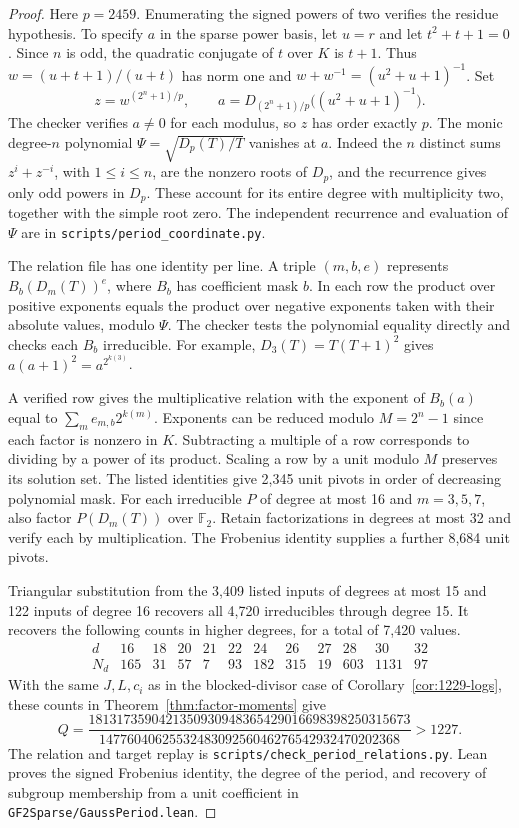 \documentclass[11pt]{article}
\newcommand{\F}{\mathbb F_2}
\begin{document}
\begin{proof}
Here \(p=2459\). Enumerating the signed powers of two verifies the
residue hypothesis. To specify \(a\) in the sparse power basis,
let \(u=r\) and let \(t^2+t+1=0\). Since \(n\) is odd, the quadratic
conjugate of \(t\) over \(K\) is \(t+1\). Thus
\(w=(u+t+1)/(u+t)\) has norm one and
\(w+w^{-1}=(u^2+u+1)^{-1}\). Set
\[
 z=w^{(2^n+1)/p},\qquad a=D_{(2^n+1)/p}\big((u^2+u+1)^{-1}\big).
\]
The checker verifies \(a\ne0\) for each modulus, so \(z\) has order
exactly \(p\). The monic degree-\(n\) polynomial
\(\Psi=\sqrt{D_p(T)/T}\) vanishes at \(a\). Indeed the \(n\) distinct
sums \(z^i+z^{-i}\), with \(1\le i\le n\), are the nonzero roots
of \(D_p\), and the recurrence gives only odd powers in \(D_p\).
These account for its entire degree with multiplicity two, together
with the simple root zero. The independent recurrence and evaluation of
\(\Psi\) are in \nolinkurl{scripts/period_coordinate.py}.

The relation file has one identity per line. A triple \((m,b,e)\)
represents \(B_b(D_m(T))^e\), where \(B_b\) has coefficient mask
\(b\). In each row the product over positive exponents equals the
product over negative exponents taken with their absolute values, modulo \(\Psi\). The checker tests the
polynomial equality directly and checks each \(B_b\) irreducible.
For example, \(D_3(T)=T(T+1)^2\) gives
\(a(a+1)^2=a^{2^{k(3)}}\).

A verified row gives the multiplicative relation with the exponent
of \(B_b(a)\) equal to \(\sum_m e_{m,b}2^{k(m)}\). Exponents can be
reduced modulo \(M=2^n-1\) since each factor is nonzero in \(K\).
Subtracting a multiple of a row corresponds to dividing by a power
of its product. Scaling a row by a unit modulo \(M\) preserves its
solution set. The listed identities give 2,345 unit pivots in order of decreasing
polynomial mask. For each irreducible \(P\) of degree at most 16 and
\(m=3,5,7\), also factor \(P(D_m(T))\) over \(\F\). Retain
factorizations in degrees at most 32 and verify each by multiplication.
The Frobenius identity supplies a further 8,684 unit pivots.

Triangular substitution from the 3,409 listed inputs of degrees at
most 15 and 122 inputs of degree 16 recovers all 4,720 irreducibles
through degree 15. It recovers the following counts in higher degrees,
for a total of 7,420 values.
\[
\begin{array}{c|rrrrrrrrrrr}
d&16&18&20&21&22&24&26&27&28&30&32\\\hline
N_d&165&31&57&7&93&182&315&19&603&1131&97
\end{array}
\]
With the same \(J,L,c_i\) as in the blocked-divisor case of
Corollary~\ref{cor:1229-logs}, these counts in
Theorem~\ref{thm:factor-moments} give
\[
Q=\frac{1813173590421350930948365429016698398250315673}
       {1477604062553248309256046276542932470202368}>1227 .
\]
The relation and target replay is \nolinkurl{scripts/check_period_relations.py}.
Lean proves the signed Frobenius identity, the degree of the period,
and recovery of subgroup membership from a unit coefficient in
\nolinkurl{GF2Sparse/GaussPeriod.lean}.
\end{proof}
\end{document}
